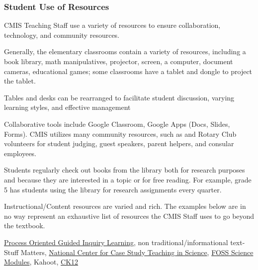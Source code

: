 \subsubsection{Student Use of Resources}



\begin{findings}
CMIS Teaching Staff use a variety of resources to ensure collaboration, technology, and community resources. 

Generally, the elementary classrooms contain a variety of resources, including a book library, math manipulatives, projector, screen, a computer, document cameras, educational games; some classrooms have a tablet and dongle to project the tablet. 

Tables and desks can be rearranged to facilitate student discussion, varying learning styles, and effective management

Collaborative tools include Google Classroom, Google Apps (Docs, Slides, Forms). CMIS utilizes many community resources, such as and Rotary Club volunteers for student judging, guest speakers, parent helpers, and consular employees. 

Students regularly check out books from the library both for research purposes and  because they are interested in a topic or for free reading.  For example, grade 5 has students using the library for research assignments every quarter. 

Instructional/Content resources are varied and rich. The examples below are in no way represent an exhaustive list of resources the CMIS Staff uses to go beyond the textbook. 
 

\href{https://pogil.org/}{Process Oriented Guided Inquiry Learning}, non traditional/informational text- Stuff Matters, \href{http://sciencecases.lib.buffalo.edu/cs/}{National Center for Case Study Teaching in Science}, \href{https://docs.google.com/a/cmis.ac.th/document/d/16TR92UNODi6qAM_vZkqFmqV_NGde5JCabfIoimXw8EM/edit?usp=sharing}{FOSS Science Modules}, Kahoot, \href{http://www.ck12.org/}{CK12}


\end{findings}
